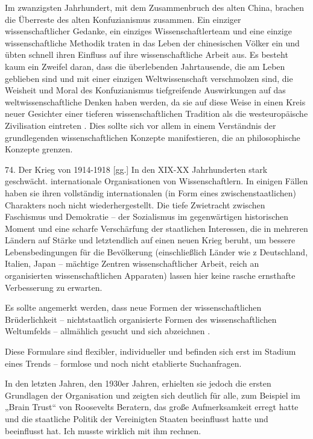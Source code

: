 \documentclass[11pt,a4paper]{book}
\begin{document}
Im zwanzigsten Jahrhundert, mit dem Zusammenbruch des alten China, brachen die Überreste des alten Konfuzianismus zusammen. Ein einziger wissenschaftlicher Gedanke, ein einziges Wissenschaftlerteam und eine einzige wissenschaftliche Methodik traten in das Leben der chinesischen Völker ein und übten schnell ihren Einfluss auf ihre wissenschaftliche Arbeit aus. Es besteht kaum ein Zweifel daran, dass die überlebenden Jahrtausende, die am Leben geblieben sind und mit einer einzigen Weltwissenschaft verschmolzen sind, die Weisheit und Moral des Konfuzianismus tiefgreifende Auswirkungen auf das weltwissenschaftliche Denken haben werden, da sie auf diese Weise in einen Kreis neuer Gesichter einer tieferen wissenschaftlichen Tradition als die westeuropäische Zivilisation eintreten . Dies sollte sich vor allem in einem Verständnis der grundlegenden wissenschaftlichen Konzepte manifestieren, die an philosophische Konzepte grenzen.



74. Der Krieg von 1914-1918 [gg.] In den XIX-XX Jahrhunderten stark geschwächt. internationale Organisationen von Wissenschaftlern. In einigen Fällen haben sie ihren vollständig internationalen (in Form eines zwischenstaatlichen) Charakters noch nicht wiederhergestellt. Die tiefe Zwietracht zwischen Faschismus und Demokratie -- der Sozialismus im gegenwärtigen historischen Moment und eine scharfe Verschärfung der staatlichen Interessen, die in mehreren Ländern auf Stärke und letztendlich auf einen neuen Krieg beruht, um bessere Lebensbedingungen für die Bevölkerung (einschließlich Länder wie z Deutschland, Italien, Japan -- mächtige Zentren wissenschaftlicher Arbeit, reich an organisierten wissenschaftlichen Apparaten) lassen hier keine rasche ernsthafte Verbesserung zu erwarten.



Es sollte angemerkt werden, dass neue Formen der wissenschaftlichen Brüderlichkeit -- nichtstaatlich organisierte Formen des wissenschaftlichen Weltumfelds -- allmählich gesucht und sich abzeichnen .



Diese Formulare sind flexibler, individueller und befinden sich erst im Stadium eines Trends -- formlose und noch nicht etablierte Suchanfragen.



In den letzten Jahren, den 1930er Jahren, erhielten sie jedoch die ersten Grundlagen der Organisation und zeigten sich deutlich für alle, zum Beispiel im „Brain Trust“ von Roosevelts Beratern, das große Aufmerksamkeit erregt hatte und die staatliche Politik der Vereinigten Staaten beeinflusst hatte und beeinflusst hat. Ich musste wirklich mit ihm rechnen.
\end{document}
